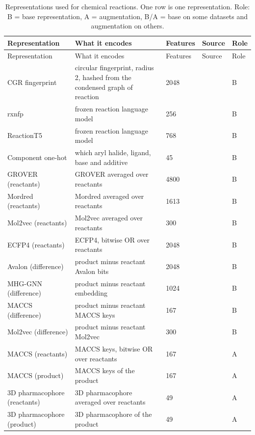 \begin{longtable}{P{3.0cm}P{5.0cm}P{1.5cm}P{1.5cm}P{1.4cm}}
\caption[Representations used for chemical reactions.]{Representations used for chemical reactions. One row is one representation. Role: B = base representation, A = augmentation, B/A = base on some datasets and augmentation on others.}\label{tab:reps_reactions}\\
\toprule
Representation & What it encodes & Features & Source & Role \\
\midrule
\endfirsthead
\toprule
Representation & What it encodes & Features & Source & Role \\
\midrule
\endhead
\bottomrule
\endfoot
CGR fingerprint & circular fingerprint, radius 2, hashed from the condensed graph of reaction & 2048 & \citep{Hoonakker2011} & B \\
rxnfp & frozen reaction language model & 256 & \citep{Schwaller2021rxnfp} & B \\
ReactionT5 & frozen reaction language model & 768 & \citep{Sagawa2023ReactionT5} & B \\
Component one-hot & which aryl halide, ligand, base and additive & 45 & \citep{Ahneman2018} & B \\
GROVER (reactants) & GROVER averaged over reactants & 4800 & \citep{Rong2020GROVER} & B \\
Mordred (reactants) & Mordred averaged over reactants & 1613 & \citep{Moriwaki2018} & B \\
Mol2vec (reactants) & Mol2vec averaged over reactants & 300 & \citep{Jaeger2018} & B \\
ECFP4 (reactants) & ECFP4, bitwise OR over reactants & 2048 & \citep{rogers2010} & B \\
Avalon (difference) & product minus reactant Avalon bits & 2048 & \citep{Gedeck2006} & B \\
MHG-GNN (difference) & product minus reactant embedding & 1024 & \citep{kishimoto2023} & B \\
MACCS (difference) & product minus reactant MACCS keys & 167 & \citep{Durant2002} & B \\
Mol2vec (difference) & product minus reactant Mol2vec & 300 & \citep{Jaeger2018} & B \\
MACCS (reactants) & MACCS keys, bitwise OR over reactants & 167 & \citep{Durant2002} & A \\
MACCS (product) & MACCS keys of the product & 167 & \citep{Durant2002} & A \\
3D pharmacophore (reactants) & 3D pharmacophore averaged over reactants & 49 & \citep{rdkit} & A \\
3D pharmacophore (product) & 3D pharmacophore of the product & 49 & \citep{rdkit} & A \\
\end{longtable}

